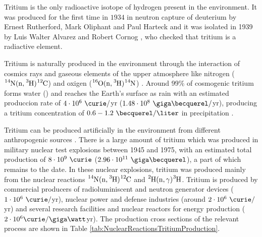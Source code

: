 Tritium is the only radioactive isotope of hydrogen present in the environment. It was produced for the first time in $1934$ in neutron capture of deuterium by Ernest Rutherford, Mark Oliphant and Paul Harteck \cite{TritiumDiscovery} and it was isolated in 1939 by Luis Walter Alvarez and Robert Cornog \cite{TritiumIsolate}, who checked that tritium is a radiactive element. 

Tritium is naturally produced in the environment through the interaction of cosmics rays and gaseous elements of the upper atmosphere like nitrogen ($\ce{^{14}N}(\ce{n},\ce{^{3}H})\ce{^{12}C}$) \cite{TritiumHandling} and oxigen ($\ce{^{16}O}(\ce{n},\ce{^{3}H})\ce{^{14}N}$) \cite{OxigenTritium}. Around 99\% of cosmogenic tritium forms water () and reaches the Earth's surface as rain with an estimated produccion rate of $4\cdot 10^6 ~\curie/$yr ($1.48 \cdot 10^8 ~\giga\becquerel/$yr), producing a tritium concentration of $0.6-1.2~\becquerel/\liter$ in precipitation \cite{CommonEmissionTritium, TritiumHandling}. 

Tritium can be produced artificially in the environment from different anthropogenic sources \cite{CommonEmissionTritium, TritiumHandling}. There is a large amount of tritium which was produced in military nuclear test explosions between 1945 and 1975, with an estimated total production of $8 \cdot 10^9~\curie$ ($2.96 \cdot 10^{11}~\giga\becquerel$), a part of which remains to the date. In these nuclear explosions, tritium was produced mainly from the nuclear reactions $\ce{^{14}N}(\ce{n},\ce{^{3}H})\ce{^{12}C}$ and $\ce{^{2}H}(\ce{n},\gamma)\ce{^{3}H}$. Tritium is produced by commercial producers of radioluminiscent and neutron generator devices ($1 \cdot 10^6~\curie/$yr), nuclear power and defense industries (around $2 \cdot 10^6~\curie/$yr) and several research facilities and nuclear reactors for energy production ($2 \cdot 10^6 \curie/\giga\watt$yr). The production cross sections of the relevant process are shown in Table \ref{tab:NuclearReactionsTritiumProduction}.

